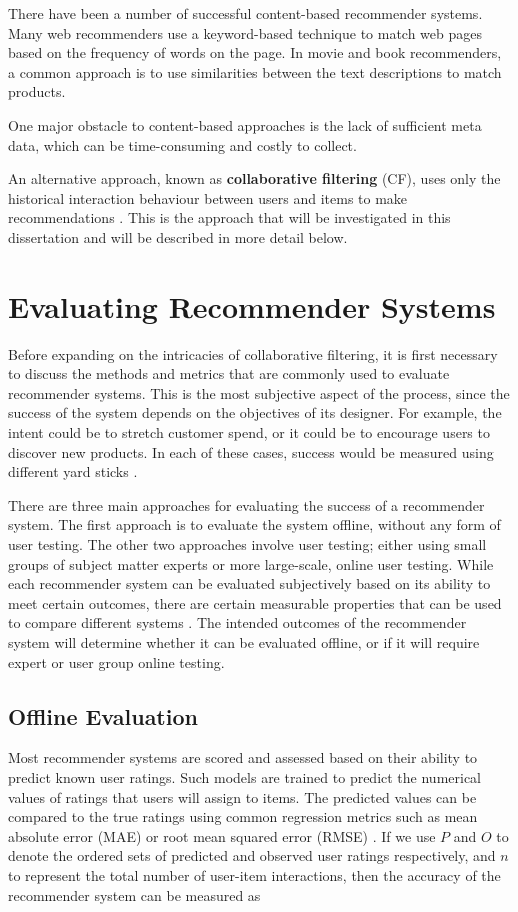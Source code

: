 There have been a number of successful content-based recommender systems. Many web recommenders use a keyword-based technique to match web pages based on the frequency of words on the page. In movie and book recommenders, a common approach is to use similarities between the text descriptions to match products. \parencite{handbook_1.3_content-based}

One major obstacle to content-based approaches is the lack of sufficient meta data, which can be time-consuming and costly to collect. \parencite{cf_1.6_implicit}

An alternative approach, known as \textbf{collaborative filtering} (CF), uses only the historical interaction behaviour between users and items to make recommendations \parencite{cf_1.1}. This is the approach that will be investigated in this dissertation and will be described in more detail below.

\section{Evaluating Recommender Systems}
Before expanding on the intricacies of collaborative filtering, it is first necessary to discuss the methods and metrics that are commonly used to evaluate recommender systems. This is the most subjective aspect of the process, since the success of the system depends on the objectives of its designer. For example, the intent could be to stretch customer spend, or it could be to encourage users to discover new products. In each of these cases, success would be measured using different yard sticks \parencite{eval_colab}.

There are three main approaches for evaluating the success of a recommender system. The first approach is to evaluate the system offline, without any form of user testing. The other two approaches involve user testing; either using small groups of subject matter experts or more large-scale, online user testing. While each recommender system can be evaluated subjectively based on its ability to meet certain outcomes, there are certain measurable properties that can be used to compare different systems \parencite{handbook_1.8_evaluation}. The intended outcomes of the recommender system will determine whether it can be evaluated offline, or if it will require expert or user group online testing.

\subsection{Offline Evaluation}
Most recommender systems are scored and assessed based on their ability to predict known user ratings. Such models are trained to predict the numerical values of ratings that users will assign to items. The predicted values can be compared to the true ratings using common regression metrics such as mean absolute error (MAE) or root mean squared error (RMSE) \parencite{eval_coverage}. If we use $P$ and $O$ to denote the ordered sets of predicted and observed user ratings respectively, and $n$ to represent the total number of user-item interactions, then the accuracy of the recommender system can be measured as

